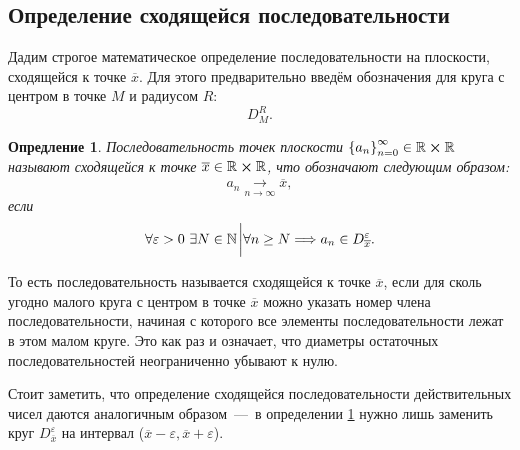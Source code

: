 \documentclass[12pt]{article}
\newtheorem{definition}{Опредление}[section]
\begin{document}
\subsection{Определение сходящейся последовательности}
Дадим строгое математическое определение последовательности на плоскости, сходящейся к точке $\overline{x}$. Для этого предварительно введём обозначения для круга с центром в точке $M$ и радиусом $R$:
\begin{equation}
    D_M^R.
\end{equation}
\begin{definition}\label{def:31}
Последовательность точек плоскости $\qty{a_n}_{n=0}^\infty \in \mathbb{R} \cross \mathbb{R}$ называют сходящейся к точке $\overline{x} \in \mathbb{R} \cross \mathbb{R}$, что обозначают следующим образом:
\begin{equation}
   {a_n} \overset{}{\underset{n \rightarrow \infty}{\longrightarrow}} \overline{x},
\end{equation}
если 
\begin{equation}
    \forall \varepsilon > 0\ \exists N \in \mathbb{N} \eval \forall n \ge N \Longrightarrow a_n \in D_{\overline{x}}^{\varepsilon}.
\end{equation}
\end{definition}
То есть последовательность называется сходящейся к точке $\overline{x}$, если для сколь угодно малого круга с центром в точке $\overline{x}$ можно указать номер члена последовательности, начиная с которого все элементы последовательности лежат в этом малом круге. Это как раз и означает, что диаметры остаточных последовательностей неограниченно убывают к нулю.
\par
Стоит заметить, что определение сходящейся последовательности действительных чисел даются аналогичным образом~\----~в определении \ref{def:31} нужно лишь заменить круг $D_{\overline{x}}^{\varepsilon}$ на интервал ($\overline{x}-\varepsilon,\overline{x}+\varepsilon$).
\end{document}
